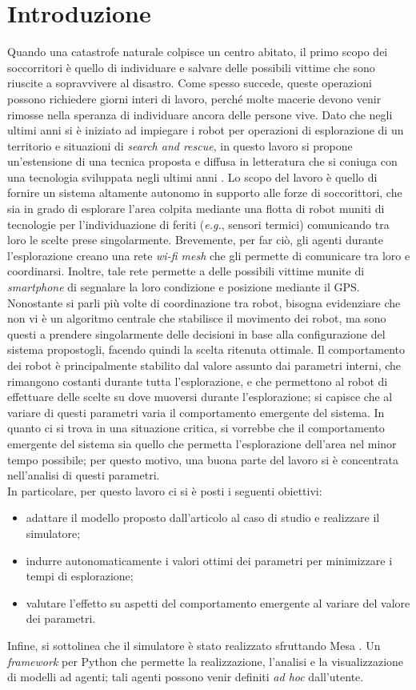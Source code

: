\chapter{Introduzione}
\label{introduction}
Quando una catastrofe naturale colpisce un centro abitato, il primo scopo dei soccorritori è quello di individuare e salvare delle possibili vittime che sono riuscite a sopravvivere al disastro.
Come spesso succede, queste operazioni possono richiedere giorni interi di lavoro, perché molte macerie devono venir rimosse nella speranza di individuare ancora delle persone vive.
Dato che negli ultimi anni si è iniziato ad impiegare i robot per operazioni di esplorazione di un territorio e situazioni di \textit{search and rescue}, in questo lavoro si propone un'estensione di una tecnica proposta e diffusa in letteratura \cite{burgard2005} che si coniuga con una tecnologia sviluppata negli ultimi anni \cite{OWL}.
Lo scopo del lavoro è quello di fornire un sistema altamente autonomo in supporto alle forze di soccorittori, che sia in grado di esplorare l'area colpita mediante una flotta di robot muniti di tecnologie per l'individuazione di feriti (\textit{e.g.}, sensori termici) comunicando tra loro le scelte prese singolarmente.
Brevemente, per far ciò, gli agenti durante l'esplorazione creano una rete \textit{wi-fi mesh} che gli permette di comunicare tra loro e coordinarsi.
Inoltre, tale rete permette a delle possibili vittime munite di \textit{smartphone} di segnalare la loro condizione e posizione mediante il GPS.
Nonostante si parli più volte di coordinazione tra robot, bisogna evidenziare che non vi è un algoritmo centrale che stabilisce il movimento dei robot, ma sono questi a prendere singolarmente delle decisioni in base alla configurazione del sistema propostogli, facendo quindi la scelta ritenuta ottimale.
Il comportamento dei robot è principalmente stabilito dal valore assunto dai parametri interni, che rimangono costanti durante tutta l'esplorazione, e che permettono al robot di effettuare delle scelte su dove muoversi durante l'esplorazione; si capisce che al variare di questi parametri varia il comportamento emergente del sistema.
In quanto ci si trova in una situazione critica, si vorrebbe che il comportamento emergente del sistema sia quello che permetta l'esplorazione dell'area nel minor tempo possibile; per questo motivo, una buona parte del lavoro si è concentrata nell'analisi di questi parametri.\\
In particolare, per questo lavoro ci si è posti i seguenti obiettivi:\begin{itemize}
	\item adattare il modello proposto dall'articolo al caso di studio e realizzare il simulatore;
	\item indurre autonomaticamente i valori ottimi dei parametri per minimizzare i tempi di esplorazione;
	\item valutare l'effetto su aspetti del comportamento emergente al variare del valore dei parametri.
\end{itemize}
Infine, si sottolinea che il simulatore è stato realizzato sfruttando Mesa \cite{Mesa}.
Un \textit{framework} per Python che permette la realizzazione, l'analisi e la visualizzazione di modelli ad agenti; tali agenti possono venir definiti \textit{ad hoc} dall'utente.